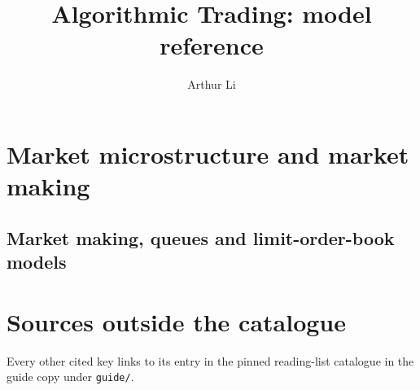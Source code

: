 \documentclass[8pt,a4paper,oneside,openany]{extbook}
\title{Algorithmic Trading: model reference}
\author{Arthur Li}
\begin{document}
\frontmatter
\maketitle
\tableofcontents



\mainmatter
\chapter{Market microstructure and market making}\label{drv:execution-market-making}

\section{Market making, queues and limit-order-book models}\label{drv:pathway:market-making-lob}






\backmatter
{}
\chapter{Sources outside the catalogue}


Every other cited key links to its entry in the pinned reading-list catalogue in the guide copy under \nolinkurl{guide/}.
\end{document}
